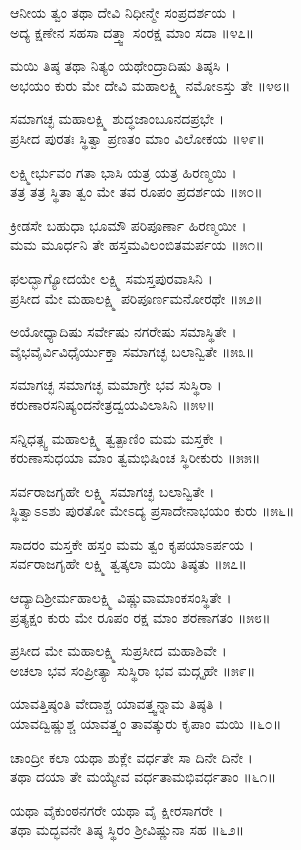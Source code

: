 ಆನೀಯ ತ್ವಂ ತಥಾ ದೇವಿ ನಿಧೀನ್ಮೇ ಸಂಪ್ರದರ್ಶಯ ।\\
ಅದ್ಯ ಕ್ಷಣೇನ ಸಹಸಾ ದತ್ತ್ವಾ ಸಂರಕ್ಷ ಮಾಂ ಸದಾ ॥೪೭॥

	ಮಯಿ ತಿಷ್ಠ ತಥಾ ನಿತ್ಯಂ ಯಥೇಂದ್ರಾದಿಷು ತಿಷ್ಠಸಿ ।\\
	ಅಭಯಂ ಕುರು ಮೇ ದೇವಿ ಮಹಾಲಕ್ಷ್ಮಿ ನಮೋಽಸ್ತು ತೇ ॥೪೮॥

ಸಮಾಗಚ್ಛ ಮಹಾಲಕ್ಷ್ಮಿ ಶುದ್ಧಜಾಂಬೂನದಪ್ರಭೇ ।\\
ಪ್ರಸೀದ ಪುರತಃ ಸ್ಥಿತ್ವಾ ಪ್ರಣತಂ ಮಾಂ ವಿಲೋಕಯ ॥೪೯॥

	ಲಕ್ಷ್ಮೀರ್ಭುವಂ ಗತಾ ಭಾಸಿ ಯತ್ರ ಯತ್ರ ಹಿರಣ್ಮಯಿ ।\\
	ತತ್ರ ತತ್ರ ಸ್ಥಿತಾ ತ್ವಂ ಮೇ ತವ ರೂಪಂ ಪ್ರದರ್ಶಯ ॥೫೦॥

ಕ್ರೀಡಸೇ ಬಹುಧಾ ಭೂಮೌ ಪರಿಪೂರ್ಣಾ ಹಿರಣ್ಮಯೀ ।\\
ಮಮ ಮೂರ್ಧನಿ ತೇ ಹಸ್ತಮವಿಲಂಬಿತಮರ್ಪಯ ॥೫೧॥

ಫಲದ್ಭಾಗ್ಯೋದಯೇ ಲಕ್ಷ್ಮಿ ಸಮಸ್ತಪುರವಾಸಿನಿ ।\\
ಪ್ರಸೀದ ಮೇ ಮಹಾಲಕ್ಷ್ಮಿ ಪರಿಪೂರ್ಣಮನೋರಥೇ ॥೫೨॥

	ಅಯೋಧ್ಯಾದಿಷು ಸರ್ವೇಷು ನಗರೇಷು ಸಮಾಸ್ಥಿತೇ ।\\
	ವೈಭವೈರ್ವಿವಿಧೈರ್ಯುಕ್ತಾ ಸಮಾಗಚ್ಛ ಬಲಾನ್ವಿತೇ ॥೫೩॥

ಸಮಾಗಚ್ಛ ಸಮಾಗಚ್ಛ ಮಮಾಗ್ರೇ ಭವ ಸುಸ್ಥಿರಾ ।\\
ಕರುಣಾರಸನಿಷ್ಯಂದನೇತ್ರದ್ವಯವಿಲಾಸಿನಿ ॥೫೪॥

	ಸನ್ನಿಧತ್ಸ್ವ ಮಹಾಲಕ್ಷ್ಮಿ ತ್ವತ್ಪಾಣಿಂ ಮಮ ಮಸ್ತಕೇ ।\\
	ಕರುಣಾಸುಧಯಾ ಮಾಂ ತ್ವಮಭಿಷಿಂಚ ಸ್ಥಿರೀಕುರು ॥೫೫॥

ಸರ್ವರಾಜಗೃಹೇ ಲಕ್ಷ್ಮಿ ಸಮಾಗಚ್ಛ ಬಲಾನ್ವಿತೇ ।\\
ಸ್ಥಿತ್ವಾಽಽಶು ಪುರತೋ ಮೇಽದ್ಯ ಪ್ರಸಾದೇನಾಭಯಂ ಕುರು ॥೫೬॥

	ಸಾದರಂ ಮಸ್ತಕೇ ಹಸ್ತಂ ಮಮ ತ್ವಂ ಕೃಪಯಾಽರ್ಪಯ ।\\
	ಸರ್ವರಾಜಗೃಹೇ ಲಕ್ಷ್ಮಿ ತ್ವತ್ಕಲಾ ಮಯಿ ತಿಷ್ಠತು ॥೫೭॥

ಆದ್ಯಾದಿಶ್ರೀರ್ಮಹಾಲಕ್ಷ್ಮಿ ವಿಷ್ಣುವಾಮಾಂಕಸಂಸ್ಥಿತೇ ।\\
ಪ್ರತ್ಯಕ್ಷಂ ಕುರು ಮೇ ರೂಪಂ ರಕ್ಷ ಮಾಂ ಶರಣಾಗತಂ ॥೫೮॥

	ಪ್ರಸೀದ ಮೇ ಮಹಾಲಕ್ಷ್ಮಿ ಸುಪ್ರಸೀದ ಮಹಾಶಿವೇ ।\\
	ಅಚಲಾ ಭವ ಸಂಪ್ರೀತ್ಯಾ ಸುಸ್ಥಿರಾ ಭವ ಮದ್ಗೃಹೇ ॥೫೯॥

ಯಾವತ್ತಿಷ್ಠಂತಿ ವೇದಾಶ್ಚ ಯಾವತ್ತ್ವನ್ನಾಮ ತಿಷ್ಠತಿ ।\\
ಯಾವದ್ವಿಷ್ಣುಶ್ಚ ಯಾವತ್ತ್ವಂ ತಾವತ್ಕುರು ಕೃಪಾಂ ಮಯಿ ॥೬೦॥

	ಚಾಂದ್ರೀ ಕಲಾ ಯಥಾ ಶುಕ್ಲೇ ವರ್ಧತೇ ಸಾ ದಿನೇ ದಿನೇ ।\\
	ತಥಾ ದಯಾ ತೇ ಮಯ್ಯೇವ ವರ್ಧತಾಮಭಿವರ್ಧತಾಂ ॥೬೧॥

ಯಥಾ ವೈಕುಂಠನಗರೇ ಯಥಾ ವೈ ಕ್ಷೀರಸಾಗರೇ ।\\
ತಥಾ ಮದ್ಭವನೇ ತಿಷ್ಠ ಸ್ಥಿರಂ ಶ್ರೀವಿಷ್ಣುನಾ ಸಹ ॥೬೨॥

